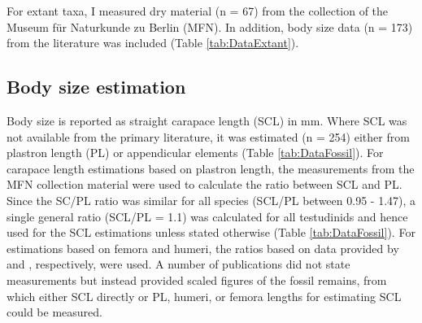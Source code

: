 For extant taxa, I measured dry material (n = 67) from the collection of the Museum für Naturkunde zu Berlin (MFN). In addition, body size data (n = 173) from the literature was included (Table \ref{tab:DataExtant}).

\subsection{Body size estimation}
Body size is reported as straight carapace length (SCL) in mm. Where SCL was not available from the primary literature, it was estimated (n = 254) either from plastron length (PL) or appendicular elements (Table \ref{tab:DataFossil}). For carapace length estimations based on plastron length, the measurements from the MFN collection material were used to calculate the ratio between SCL and PL. Since the SC/PL ratio was similar for all species (SCL/PL between 0.95 - 1.47), a single general ratio (SCL/PL = 1.1) was calculated for all testudinids and hence used for the SCL estimations unless stated otherwise (Table \ref{tab:DataFossil}). For estimations based on femora and humeri, the ratios based on data provided by \cite{Hutterer1998} and \cite{Franz2001a}, respectively, were used. A number of publications did not state measurements but instead provided scaled figures of the fossil remains, from which either SCL directly or PL, humeri, or femora lengths for estimating SCL could be measured.


